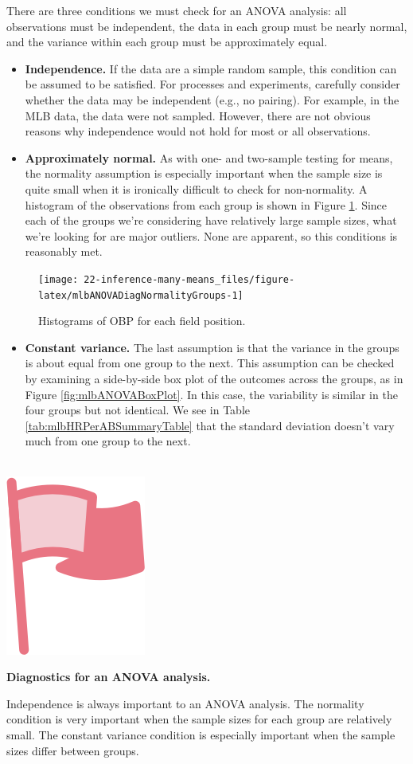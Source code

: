 \documentclass[
  10pt,
  openany]{book}
\providecommand{\tightlist}{%
  \setlength{\itemsep}{0pt}\setlength{\parskip}{0pt}}
\newenvironment{mdframedwithfootImportant}
{   
    \savenotes
    \begin{mdframed}[%
    topline=true, bottomline=true, linecolor=oiR, linewidth=0.5pt,
    rightline=false, leftline=false,
    backgroundcolor=oiLGray]
    \renewcommand{\thempfootnote}{\arabic{footnote}}
    }
{
    \end{mdframed}
    \spewnotes
}
\newenvironment{important}{
    \let\oldtextbf\textbf
    \renewcommand{\textbf}[1]{{\textcolor{oiR}{\oldtextbf{##1}}}}
\vspace{4mm}
\begin{mdframedwithfootImportant}
\begin{minipage}[t]{0.10\textwidth}
{$\:$ \\ \setkeys{Gin}{width=2.5em,keepaspectratio}\includegraphics{images/_icons/important.png}}
\end{minipage}
\hfill
\begin{minipage}[t]{0.90\textwidth}
\vspace{-2mm}
\setlength{\parskip}{1em}
}{\end{minipage}
\end{mdframedwithfootImportant}
\vspace{4mm}
}
\begin{document}
There are three conditions we must check for an ANOVA analysis: all observations must be independent, the data in each group must be nearly normal, and the variance within each group must be approximately equal.

\begin{itemize}
\item
  \textbf{Independence.} If the data are a simple random sample, this condition can be assumed to be satisfied.
  For processes and experiments, carefully consider whether the data may be independent (e.g., no pairing).
  For example, in the MLB data, the data were not sampled.
  However, there are not obvious reasons why independence would not hold for most or all observations.
\item
  \textbf{Approximately normal.} As with one- and two-sample testing for means, the normality assumption is especially important when the sample size is quite small when it is ironically difficult to check for non-normality.
  A histogram of the observations from each group is shown in Figure \ref{fig:mlbANOVADiagNormalityGroups}.
  Since each of the groups we're considering have relatively large sample sizes, what we're looking for are major outliers.
  None are apparent, so this conditions is reasonably met.
\end{itemize}

\begin{figure}[h]

{\centering \texttt{[image: 22-inference-many-means\_files/figure-latex/mlbANOVADiagNormalityGroups-1]} 

}

\caption{Histograms of OBP for each field position.}\label{fig:mlbANOVADiagNormalityGroups}
\end{figure}

\begin{itemize}
\tightlist
\item
  \textbf{Constant variance.} The last assumption is that the variance in the groups is about equal from one group to the next. This assumption can be checked by examining a side-by-side box plot of the outcomes across the groups, as in Figure \ref{fig:mlbANOVABoxPlot}. In this case, the variability is similar in the four groups but not identical. We see in Table \ref{tab:mlbHRPerABSummaryTable} that the standard deviation doesn't vary much from one group to the next.
\end{itemize}

\begin{important}
\textbf{Diagnostics for an ANOVA analysis.}

Independence is always important to an ANOVA analysis.
The normality condition is very important when the sample sizes for each group are relatively small.
The constant variance condition is especially important when the sample sizes differ between groups.

\end{important}
\end{document}
